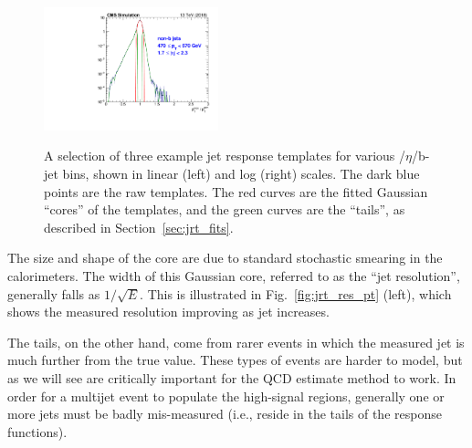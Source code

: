 \begin{figure}[htbp]
\begin{center}
    \includegraphics[width=0.45\textwidth]{figs/jetmet/pt10_eta06_nonbjets_log.pdf} \\
    \caption{A selection of three example jet response templates for various \pt/$\eta$/b-jet bins, shown in linear (left) and log (right) scales.
    The dark blue points are the raw templates. The red curves are the fitted Gaussian ``cores'' of the templates, and the green
    curves are the ``tails'', as described in Section~\ref{sec:jrt_fits}.
           }
    \label{fig:jrt_examples}
  \end{center}
\end{figure}

The size and shape of the core are due to standard stochastic smearing in the calorimeters. 
The width of this Gaussian core, referred to
as the ``jet resolution'', generally falls as $1/\sqrt{E}$. This is illustrated in 
Fig.~\ref{fig:jrt_res_pt} (left), which shows the measured
resolution improving as jet \pt increases.

The tails, on the other hand, come from rarer events in which the measured jet \pt 
is much further from the true value. These types of events
are harder to model, but as we will see are critically important for the 
QCD estimate method to work. In order for a multijet event to populate the high-\ptmiss signal regions, 
generally one or more jets must be badly mis-measured
(i.e., reside in the tails of the response functions).

